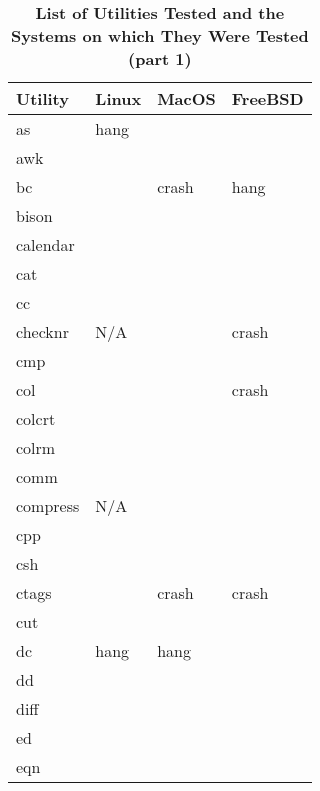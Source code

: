 
\begin{table}[htbp]  %
\renewcommand\thetable{1}
\centering  %
 \begin{tabular}{|p{2.5cm}|p{2cm}|p{2cm}|p{2cm}|}  
     \hline
     \hline
        Utility & Linux & MacOS & FreeBSD \\ %
       \hline
       as & hang  &   &    \\
       awk &   &   &    \\
       bc &   & crash  & hang   \\
       bison &   &   &    \\
       calendar &   &   &    \\
       cat &   &   &    \\
       cc &   &   &    \\
       checknr & N/A  &   &  crash  \\
       cmp &   &   &    \\
       col &   &   &  crash  \\
       colcrt &   &   &    \\
       colrm &   &   &    \\
       comm &   &   &    \\
       compress & N/A  &   &    \\
       cpp &   &   &    \\
       csh &   &   &    \\
       ctags &   & crash  & crash   \\
       cut &   &   &   \\
       dc & hang  & hang  &    \\
       dd &   &   &    \\
       diff &   &   &    \\
       ed &   &   &    \\
       eqn &   &   &    \\
       \hline
       \hline
   \end{tabular}
   \caption{\textbf{List of Utilities Tested and the Systems on which They Were Tested (part 1)}}  %
\end{table}

